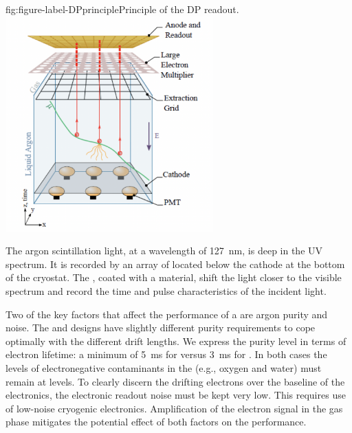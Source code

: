\begin{dunefigure}{fig:figure-label-DPprinciple}{Principle of the DP readout.}
\includegraphics[width=0.6\textwidth]{graphics/dualphase-principle}
\end{dunefigure}

The argon scintillation light, at a wavelength of  \SI{127}{nm}, is deep in the UV spectrum. It is recorded by an array of  located below the cathode at the bottom of the cryostat.  The , coated with a  material, shift the light closer to the visible spectrum and record the time and pulse characteristics of the incident light.

Two of the key factors that affect the performance of a  are argon purity and noise.  The  and  designs have slightly different purity requirements to cope optimally with the different drift lengths. We express the purity level in terms of electron lifetime: a minimum of \SI{5}{ms} for  versus \SI{3}{ms} for . In both cases the levels of electronegative contaminants in the  (e.g., oxygen and water) must remain 
at  levels.  
To clearly discern the drifting electrons over the baseline of the electronics, the   electronic readout noise must be kept very low. This requires use of low-noise cryogenic electronics. 
Amplification of the electron signal in the gas phase mitigates the potential effect of both factors on the performance. %



